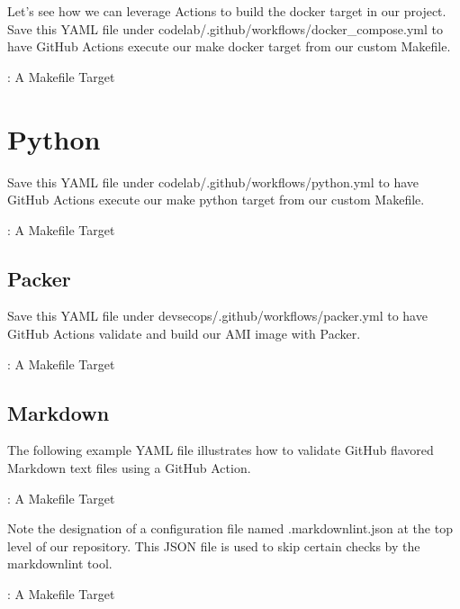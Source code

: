 Let's see how we can leverage Actions to build the docker target in our
project. Save this YAML file under
codelab/.github/workflows/docker\_compose.yml to have GitHub Actions
execute our make docker target from our custom Makefile.

\begin{mybox}{\thetcbcounter: A Makefile Target}
	
\end{mybox}


\section{Python}

Save this YAML file under codelab/.github/workflows/python.yml to have
GitHub Actions execute our make python target from our custom Makefile.

\begin{mybox}{\thetcbcounter: A Makefile Target}
	
\end{mybox}

\subsection{Packer}

Save this YAML file under devsecops/.github/workflows/packer.yml to have
GitHub Actions validate and build our AMI image with Packer.


\begin{mybox}{\thetcbcounter: A Makefile Target}
	
\end{mybox}

\subsection{Markdown}

The following example YAML file illustrates how to validate GitHub
flavored Markdown text files using a GitHub Action.

\begin{mybox}{\thetcbcounter: A Makefile Target}
	
\end{mybox}

\justify
Note the designation of a configuration file named .markdownlint.json at
the top level of our repository. This JSON file is used to skip certain
checks by the markdownlint tool.

\justify
\begin{mybox}{\thetcbcounter: A Makefile Target}
	
\end{mybox}

